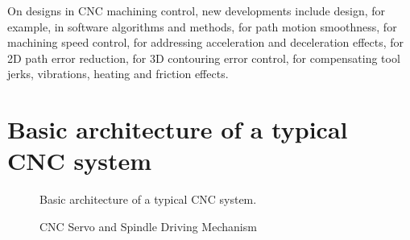 On designs in CNC machining control, new developments include design, for example, in software algorithms and methods, for path motion smoothness, for machining speed control, for addressing acceleration and deceleration effects, for 2D path error reduction, for 3D contouring error control, for compensating tool jerks, vibrations, heating and friction effects.         


\pagebreak
\clearpage
\section{Basic architecture of a typical CNC system} 

\begin{figure}[htbp]
	\begin{center}
		\caption{Basic architecture of a typical CNC system.}
		\label{fig:CNC-Basic-Architecture.jpg}
	\end{center}
\end{figure}

\begin{figure}[htbp]
	\begin{center}
		\caption{CNC Servo and Spindle Driving Mechanism}
		\label{fig:CNC-Servo-and-Spindle-Driving-Mechanism.jpg}
	\end{center}
\end{figure}


